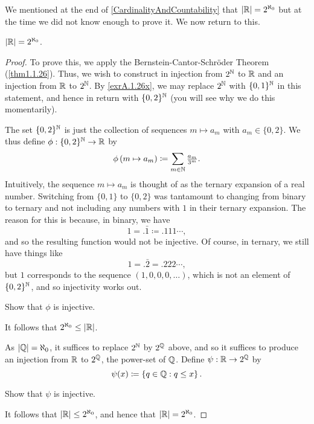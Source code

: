 We mentioned at the end of \cref{CardinalityAndCountability}  that $\lvert\mathbb{R}\rvert=2^{\aleph _0}$ but at the time we did not know enough to prove it.  We now return to this.
\begin{thm}
$\lvert\mathbb{R}\rvert=2^{\aleph _0}$.
\begin{proof}
To prove this, we apply the Bernstein-Cantor-Schr\"{o}der Theorem (\cref{thm1.1.26}).  Thus, we wish to construct in injection from $2^{\mathbb{N}}$ to $\mathbb{R}$ and an injection from $\mathbb{R}$ to $2^{\mathbb{N}}$.  By \cref{exrA.1.26x}, we may replace $2^{\mathbb{N}}$ with $\{ 0,1\} ^{\mathbb{N}}$ in this statement, and hence in return with $\{ 0,2\} ^{\mathbb{N}}$ (you will see why we do this momentarily).

The set $\{ 0,2\} ^{\mathbb{N}}$ is just the collection of sequences $m\mapsto a_m$ with $a_m \in \{ 0,2\}$.  We thus define $\phi :\{ 0,2\} ^{\mathbb{N}}\rightarrow \mathbb{R}$ by
\begin{equation}
\phi \left( m\mapsto a_m\right) \coloneqq \sum _{m\in \mathbb{N}}\tfrac{a_m}{3^m}.
\end{equation}
Intuitively, the sequence $m\mapsto a_m$ is thought of as the ternary expansion of a real number.   Switching from $\{ 0,1\}$ to $\{ 0,2\}$ was tantamount to changing from binary to ternary and not including any numbers with $1$ in their ternary expansion.  The reason for this is because, in binary, we have
\begin{equation}
1=.\bar{1}\coloneqq .111\cdots ,
\end{equation}
and so the resulting function would not be injective.  Of course, in ternary, we still have things like
\begin{equation}
1=.\bar{2}=.222\cdots ,
\end{equation}
but $1$ corresponds to the sequence $(1,0,0,0,\ldots )$, which is not an element of $\{ 0,2\} ^{\mathbb{N}}$, and so injectivity works out.
\begin{exr}
Show that $\phi$ is injective.
\end{exr}
It follows that $2^{\aleph _0}\leq \lvert\mathbb{R}\rvert$.

As $\lvert\mathbb{Q}\rvert=\aleph _0$, it suffices to replace $2^{\mathbb{N}}$ by $2^{\mathbb{Q}}$ above, and so it suffices to produce an injection from $\mathbb{R}$ to $2^{\mathbb{Q}}$, the power-set of $\mathbb{Q}$.  Define $\psi :\mathbb{R} \rightarrow 2^{\mathbb{Q}}$ by
\begin{equation}
\psi (x)\coloneqq \left\{ q\in \mathbb{Q} :q\leq x\right\} .
\end{equation}
\begin{exr}
Show that $\psi$ is injective.
\end{exr}
It follows that $\lvert\mathbb{R}\rvert\leq 2^{\aleph _0}$, and hence that $\lvert\mathbb{R}\rvert=2^{\aleph _0}$.
\end{proof}
\end{thm}

